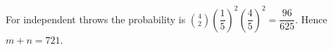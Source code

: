 For independent throws the probability is $\binom42(\dfrac{1}{5})^2(\dfrac{4}{5})^2=\dfrac{96}{625}$. Hence $m+n=\boxed{721}$.

